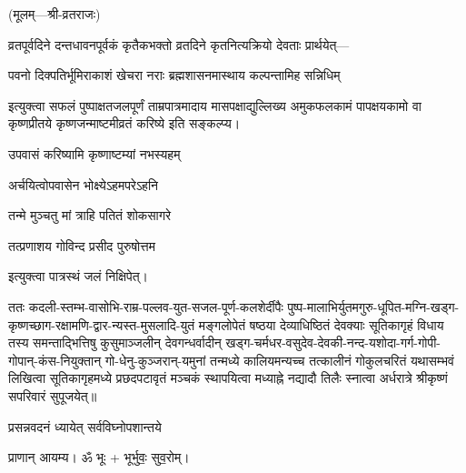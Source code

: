 
\centerline{\small{(मूलम्—श्री-व्रतराजः)}}

व्रतपूर्वदिने दन्तधावनपूर्वकं कृतैकभक्तो व्रतदिने कृतनित्यक्रियो देवताः प्रार्थयेत्—

{पवनो दिक्पतिर्भूमिराकाशं खेचरा नराः}
{ब्रह्मशासनमास्थाय कल्पन्तामिह सन्निधिम्}

इत्युक्त्वा सफलं पुष्पाक्षतजलपूर्णं ताम्रपात्रमादाय मासपक्षाद्युल्लिख्य अमुकफलकामं पापक्षयकामो वा
कृष्णप्रीतये कृष्णजन्माष्टमीव्रतं करिष्ये इति सङ्कल्प्य।

{उपवासं करिष्यामि कृष्णाष्टम्यां नभस्यहम्}

{अर्चयित्वोपवासेन भोक्ष्येऽहमपरेऽहनि}

{तन्मे मुञ्चतु मां त्राहि पतितं शोकसागरे}

{तत्प्रणाशय गोविन्द प्रसीद पुरुषोत्तम}

इत्युक्त्वा पात्रस्थं जलं निक्षिपेत्।

ततः कदली-स्तम्भ-वासोभि-राम्र-पल्लव-युत-सजल-पूर्ण-कलशेर्दीपैः पुष्प-मालाभिर्\-युतमगुरु-धूपित-मग्नि-खड्ग-कृष्णच्छाग-रक्षामणि-द्वार-न्यस्त-मुसलादि-युतं मङ्गलोपेतं षष्ठया देव्याधिष्ठितं देवक्याः
सूतिकागृहं विधाय तस्य समन्ताद्भित्तिषु कुसुमाञ्जलीन् देवगन्धर्वादीन् खड्ग-चर्मधर-वसुदेव-देवकी-नन्द-यशोदा-गर्ग-गोपी-गोपान्-कंस-नियुक्तान्
गो-धेनु-कुञ्जरान्-यमुनां तन्मध्ये कालियमन्यच्च तत्कालीनं गोकुलचरितं
यथासम्भवं लिखित्वा सूतिकागृहमध्ये प्रछदपटावृतं मञ्चकं स्थापयित्वा
मध्याह्ने नद्यादौ तिलैः स्नात्वा अर्धरात्रे श्रीकृष्णं सपरिवारं सुपूजयेत्॥




{प्रसन्नवदनं ध्यायेत् सर्वविघ्नोपशान्तये}

प्राणान् आयम्य। ॐ भूः + भूर्भुवः॒ सुव॒रोम्।


